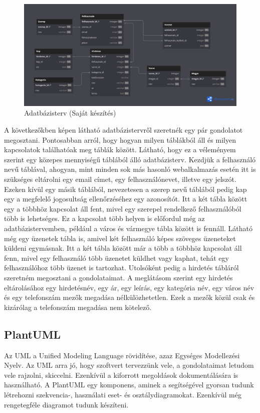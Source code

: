 \documentclass[]{thesis-ekf}
\theoremstyle{definition}
\theoremstyle{remark}
\begin{document}
	\begin{figure}[ht!]
		\centering
		\includegraphics[width=15cm]{./tervezes/dbdiagram}
		\caption{Adatbázisterv (Saját készítés)} 
		\label{dbdiagram}
	\end{figure}
	
	A következőkben  képen látható adatbázistervről szeretnék egy pár gondolatot megosztani. Pontosabban arról, hogy hogyan milyen táblákból áll és milyen kapcsolatok találhatóak meg táblák között. Látható, hogy ez a véleményem szerint egy közepes mennyiségű táblából álló adatbázisterv. Kezdjük a felhasználó nevű táblával, ahogyan, mint minden sok más hasonló webalkalmazás esetén itt is szükséges eltárolni egy email címet, egy felhasználónevet, illetve egy jelszót. Ezeken kívül egy másik táblából, nevezetesen a szerep nevű táblából pedig kap egy a megfelelő jogosultság ellenőrzéséhez egy azonosítót. Itt a két tábla között egy a többhöz kapcsolat áll fent, mivel egy szerepel rendelkező felhasználóból több is lehetséges. Ez a kapcsolat több helyen is előfordul még az adatbázistervemben, például a város és vármegye tábla között is fennáll. Látható még egy üzenetek tábla is, amivel két felhasználó képes szöveges üzeneteket küldeni egymásnak. Itt a két tábla között már a több a többhöz kapcsolat áll fenn, mivel egy felhasználó több üzenetet küldhet vagy kaphat, tehát egy felhasználóhoz több üzenet is tartozhat. Utolsóként pedig a hirdetés tábláról szeretném megosztani a gondolataimat. A meglátásom szerint egy hirdetés eltárolásához egy hirdetésnév, egy ár, egy leírás, egy kategória név, egy város név és egy telefonszám mezők megadása nélkülözhetetlen. Ezek a mezők közül csak és kizárólag a telefonszám megadása nem kötelező. 
	
	\subsection{PlantUML}\label{sc-plantuml}
	Az UML a Unified Modeling Language rövidítése, azaz Egységes Modellezési Nyelv. Az UML arra jó, hogy szoftvert tervezzünk vele, a gondolataimat letudom vele rajzolni, skiccelni. Ezenkívül a kiforrott megoldások dokumentálására is használható. A PlantUML egy komponens, aminek a segítségével gyorsan tudunk létrehozni szekvencia-, használati eset- és osztálydiagramokat. Ezenkívül még rengetegféle diagramot tudunk készíteni. \cite{PlantUML}
	
\end{document}
